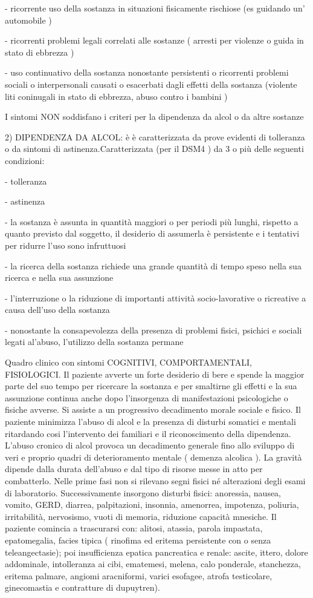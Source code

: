 \documentclass[]{article}
\begin{document}
- ricorrente uso della sostanza in situazioni fisicamente rischiose (es
guidando un' automobile )

- ricorrenti problemi legali correlati alle sostanze ( arresti per
violenze o guida in stato di ebbrezza )

- uso continuativo della sostanza nonostante persistenti o ricorrenti
problemi sociali o interpersonali causati o esacerbati dagli effetti
della sostanza (violente liti coninugali in stato di ebbrezza, abuso
contro i bambini )

I sintomi NON soddisfano i criteri per la dipendenza da alcol o da altre
sostanze

2) DIPENDENZA DA ALCOL: è è caratterizzata da prove evidenti di
tolleranza o da sintomi di astinenza.Caratterizzata (per il DSM4 ) da 3
o più delle seguenti condizioni:

- tolleranza

- astinenza

- la sostanza è assunta in quantità maggiori o per periodi più lunghi,
rispetto a quanto previsto dal soggetto, il desiderio di assumerla è
persistente e i tentativi per ridurre l'uso sono infruttuosi

- la ricerca della sostanza richiede una grande quantità di tempo speso
nella sua ricerca e nella sua assunzione

- l'interruzione o la riduzione di importanti attività socio-lavorative
o ricreative a causa dell'uso della sostanza

- nonostante la consapevolezza della presenza di problemi fisici,
psichici e sociali legati al'abuso, l'utilizzo della sostanza permane

Quadro clinico con sintomi COGNITIVI, COMPORTAMENTALI, FISIOLOGICI. Il
paziente avverte un forte desiderio di bere e spende la maggior parte
del suo tempo per ricercare la sostanza e per smaltirne gli effetti e la
sua assunzione continua anche dopo l'insorgenza di manifestazioni
psicologiche o fisiche avverse. Si assiste a un progressivo decadimento
morale sociale e fisico. Il paziente minimizza l'abuso di alcol e la
presenza di disturbi somatici e mentali ritardando cosi l'intervento dei
familiari e il riconoscimento della dipendenza. L'abuso cronico di alcol
provoca un decadimento generale fino allo sviluppo di veri e proprio
quadri di deterioramento mentale ( demenza alcolica ). La gravità
dipende dalla durata dell'abuso e dal tipo di risorse messe in atto per
combatterlo. Nelle prime fasi non si rilevano segni fisici né
alterazioni degli esami di laboratorio. Successivamente insorgono
disturbi fisici: anoressia, nausea, vomito, GERD, diarrea, palpitazioni,
insonnia, amenorrea, impotenza, poliuria, irritabilità, nervosismo,
vuoti di memoria, riduzione capacità mnesiche. Il paziente comincia a
trascurarsi con: alitosi, atassia, parola impastata, epatomegalia,
facies tipica ( rinofima ed eritema persistente con o senza
teleangectasie); poi insufficienza epatica pancreatica e renale: ascite,
ittero, dolore addominale, intolleranza ai cibi, ematemesi, melena, calo
ponderale, stanchezza, eritema palmare, angiomi aracniformi, varici
esofagee, atrofa testicolare, ginecomastia e contratture di dupuytren).
\end{document}
